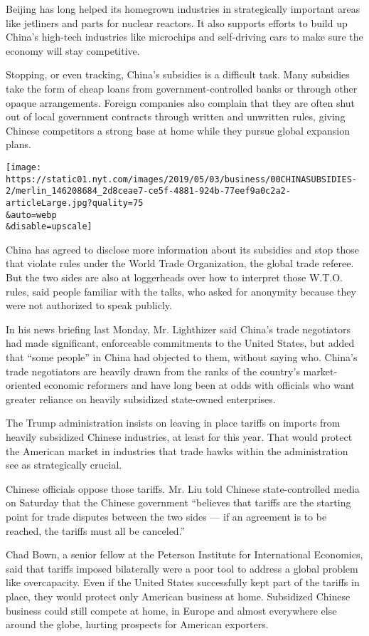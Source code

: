 Beijing has long helped its homegrown industries in strategically
important areas like jetliners and parts for nuclear reactors. It also
supports efforts to build up China's high-tech industries like
microchips and self-driving cars to make sure the economy will stay
competitive.

Stopping, or even tracking, China's subsidies is a difficult task. Many
subsidies take the form of cheap loans from government-controlled banks
or through other opaque arrangements. Foreign companies also complain
that they are often shut out of local government contracts through
written and unwritten rules, giving Chinese competitors a strong base at
home while they pursue global expansion plans.

\texttt{[image: https://static01.nyt.com/images/2019/05/03/business/00CHINASUBSIDIES-2/merlin\_146208684\_2d8ceae7-ce5f-4881-924b-77eef9a0c2a2-articleLarge.jpg?quality=75\\\&auto=webp\\\&disable=upscale]}

China has agreed to disclose more information about its subsidies and
stop those that violate rules under the World Trade Organization, the
global trade referee. But the two sides are also at loggerheads over how
to interpret those W.T.O. rules, said people familiar with the talks,
who asked for anonymity because they were not authorized to speak
publicly.

In his news briefing last Monday, Mr. Lighthizer said China's trade
negotiators had made significant, enforceable commitments to the United
States, but added that ``some people'' in China had objected to them,
without saying who. China's trade negotiators are heavily drawn from the
ranks of the country's market-oriented economic reformers and have long
been at odds with officials who want greater reliance on heavily
subsidized state-owned enterprises.

The Trump administration insists on leaving in place tariffs on imports
from heavily subsidized Chinese industries, at least for this year. That
would protect the American market in industries that trade hawks within
the administration see as strategically crucial.

Chinese officials oppose those tariffs. Mr. Liu told Chinese
state-controlled media on Saturday that the Chinese government
``believes that tariffs are the starting point for trade disputes
between the two sides --- if an agreement is to be reached, the tariffs
must all be canceled.''

Chad Bown, a senior fellow at the Peterson Institute for International
Economics, said that tariffs imposed bilaterally were a poor tool to
address a global problem like overcapacity. Even if the United States
successfully kept part of the tariffs in place, they would protect only
American business at home. Subsidized Chinese business could still
compete at home, in Europe and almost everywhere else around the globe,
hurting prospects for American exporters.

